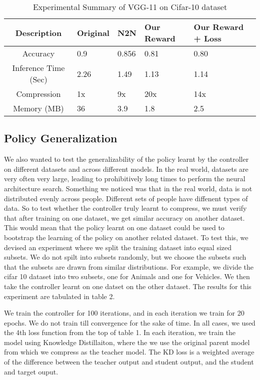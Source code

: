 \documentclass[../main]{subfiles}
\begin{document}
\begin{table*}
\caption{Experimental Summary of VGG-11 on Cifar-10 dataset}
\centering
\begin{tabular}{|c|p{1.3cm}|p{2cm}|p{1.8cm}|p{2cm}|}
 \hline
 Description & Original & N2N & Our Reward & Our Reward + Loss\\
 \hline
 Accuracy  & 0.9 & 0.856 & 0.81 & 0.80 \\
 \hline
 Inference Time (Sec) & 2.26  & 1.49 & 1.13 & 1.14 \\
 \hline
 Compression & 1x & 9x & 20x & 14x \\
 \hline 
 Memory (MB) & 36 & 3.9 & 1.8 & 2.5 \\
 \hline
\end{tabular}
\end{table*}

\subsection{Policy Generalization}

We also wanted to test the generalizability of the policy learnt by the controller on different datasets and across different models. In the real world, datasets are very often very large, leading to prohibitively long times to perform the neural architecture search. Something we noticed was that in the real world, data is not distributed evenly across people. Different sets of people have diffenent types of data. So to test whether the controller truly learnt to compress, we must verify that after training on one dataset, we get similar accuracy on another dataset. This would mean that the policy learnt on one dataset could be used to bootstrap the learning of the policy on another related dataset. To test this, we devised an experiment where we split the training dataset into equal sized subsets. We do not spilt into subsets randomly, but we choose the subsets such that the subsets are drawn from similar distributions. For example, we divide the cifar 10 dataset into two subsets, one for Animals and one for Vehicles. We then take the controller learnt on one datset on the other dataset. The results for this experiment are tabulated in table 2. 

We train the controller for 100 iterations, and in each iteration we train for 20 epochs. We do not train till convergence for the sake of time. In all cases, we used the 4th loss function from the top of table 1.%
In each iteration, we train the model using Knowledge Distillaiton, where the we use the original parent model from which we compress as the teacher model. The KD loss is a weighted average of the difference between the teacher output and student output, and the student and target ouput. 
\end{document}
